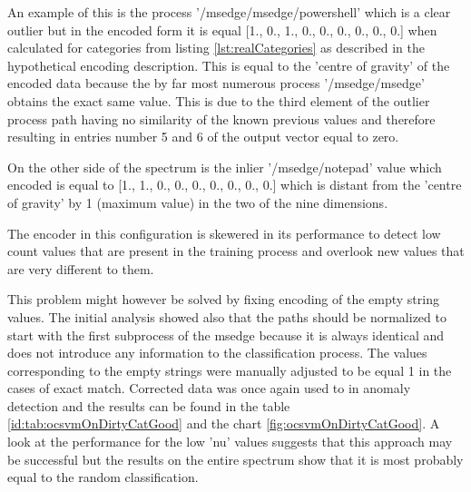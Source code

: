 \documentclass[a4paper,twoside,12pt]{book}
\begin{document}
An example of this is the process '/msedge/msedge/powershell' which is a clear outlier
but in the encoded form it is equal [1., 0., 1., 0., 0., 0., 0., 0., 0.] when calculated for 
categories from listing \ref{lst:realCategories} as described in the hypothetical encoding description.
This is equal to the 'centre of gravity' of the encoded data because the by far most numerous process
'/msedge/msedge' obtains the exact same value. This is due to the third element of the outlier process  
path having no similarity of the known previous values and therefore resulting in entries number 5 and 6
of the output vector equal to zero.

On the other side of the spectrum is the inlier '/msedge/notepad' value which encoded is equal to
[1., 1., 0., 0., 0., 0., 0., 0., 0.] which is distant from the 'centre of gravity' by 1 (maximum 
value) in the two of the nine dimensions. 

The encoder in this configuration is skewered in its performance to detect low count values that
are present in the training process and overlook new values that are very different to them. 

This problem might however be solved by fixing encoding of the empty string values. The
initial analysis showed also that the paths should be normalized to start with the first 
subprocess of the msedge because it is always identical and does not introduce any information
to the classification process. The values corresponding to the empty strings were manually adjusted
to be equal 1 in the cases of exact match. Corrected data was once again used to in anomaly detection
and the results can be found in the table \ref{id:tab:ocsvmOnDirtyCatGood} and the chart \ref{fig:ocsvmOnDirtyCatGood}. 
A look at the performance for the low 'nu' values suggests that this approach may be successful but 
the results on the entire spectrum show that it is most probably equal to the random classification.
\end{document}
